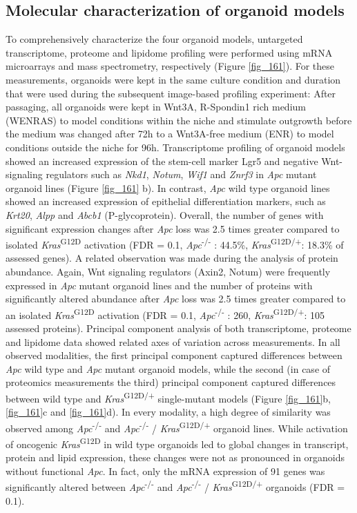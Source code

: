 \begin{flushleft}
\subsection{Molecular characterization of organoid models}
To comprehensively characterize the four organoid models, untargeted transcriptome, proteome and lipidome profiling were performed using mRNA microarrays and mass spectrometry, respectively (Figure \ref{fig_161}). For these measurements, organoids were kept in the same culture condition and duration that were used during the subsequent image-based profiling experiment: After passaging, all organoids were kept in Wnt3A, R-Spondin1 rich medium (WENRAS) to model conditions within the niche and stimulate outgrowth before the medium was changed after 72h to a Wnt3A-free medium (ENR) to model conditions outside the niche for 96h. Transcriptome profiling of organoid models showed an increased expression of the stem-cell marker Lgr5 and negative Wnt-signaling regulators such as \textit{Nkd1}, \textit{Notum}, \textit{Wif1} and \textit{Znrf3} in \textit{Apc} mutant organoid lines (Figure \ref{fig_161} b). In contrast, \textit{Apc} wild type organoid lines showed an increased expression of epithelial differentiation markers, such as \textit{Krt20}, \textit{Alpp} and \textit{Abcb1} (P-glycoprotein). Overall, the number of genes with significant expression changes after \textit{Apc} loss was 2.5 times greater compared to isolated \textit{Kras}\textsuperscript{G12D} activation (FDR = 0.1, \textit{Apc}\textsuperscript{-/-} : 44.5\%, \textit{Kras}\textsuperscript{G12D/+}: 18.3\% of assessed genes). A related observation was made during the analysis of protein abundance. Again, Wnt signaling regulators (Axin2, Notum) were frequently expressed in \textit{Apc} mutant organoid lines and the number of proteins with significantly altered abundance after \textit{Apc} loss was 2.5 times greater compared to an isolated \textit{Kras}\textsuperscript{G12D} activation (FDR = 0.1, \textit{Apc}\textsuperscript{-/-} : 260, \textit{Kras}\textsuperscript{G12D/+}: 105 assessed proteins). Principal component analysis of both transcriptome, proteome and lipidome data showed related axes of variation across measurements. In all observed modalities, the first principal component captured differences between \textit{Apc} wild type and \textit{Apc} mutant organoid models, while the second (in case of proteomics measurements the third) principal component captured differences between wild type and \textit{Kras}\textsuperscript{G12D/+} single-mutant models (Figure \ref{fig_161}b, \ref{fig_161}c and \ref{fig_161}d). In every modality, a high degree of similarity was observed among \textit{Apc}\textsuperscript{-/-}  and \textit{Apc}\textsuperscript{-/-} / \textit{Kras}\textsuperscript{G12D/+} organoid lines. While activation of oncogenic \textit{Kras}\textsuperscript{G12D} in wild type organoids led to global changes in transcript, protein and lipid expression, these changes were not as pronounced in organoids without functional \textit{Apc}. In fact, only the mRNA expression of 91 genes was significantly altered between \textit{Apc}\textsuperscript{-/-}  and \textit{Apc}\textsuperscript{-/-} / \textit{Kras}\textsuperscript{G12D/+} organoids (FDR = 0.1). 


\end{flushleft}
